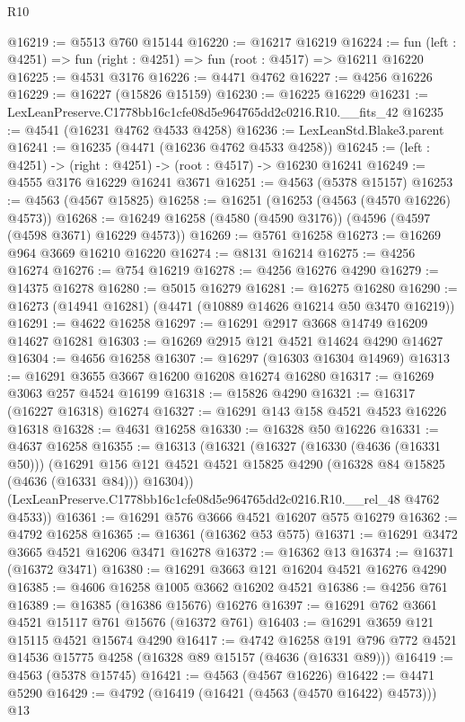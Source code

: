 \begin{lexlean}{R10}
\begin{coremodule}
@16219 := @5513 @760 @15144
@16220 := @16217 @16219
@16224 := fun (left : @4251) => fun (right : @4251) => fun (root : @4517) => @16211 @16220
@16225 := @4531 @3176
@16226 := @4471 @4762
@16227 := @4256 @16226
@16229 := @16227 (@15826 @15159)
@16230 := @16225 @16229
@16231 := LexLeanPreserve.C1778bb16c1cfe08d5e964765dd2c0216.R10.__fits_42
@16235 := @4541 (@16231 @4762 @4533 @4258)
@16236 := LexLeanStd.Blake3.parent
@16241 := @16235 (@4471 (@16236 @4762 @4533 @4258))
@16245 := (left : @4251) -> (right : @4251) -> (root : @4517) -> @16230 @16241
@16249 := @4555 @3176 @16229 @16241 @3671
@16251 := @4563 (@5378 @15157)
@16253 := @4563 (@4567 @15825)
@16258 := @16251 (@16253 (@4563 (@4570 @16226) @4573))
@16268 := @16249 @16258 (@4580 (@4590 @3176)) (@4596 (@4597 (@4598 @3671) @16229 @4573))
@16269 := @5761 @16258
@16273 := @16269 @964 @3669 @16210 @16220
@16274 := @8131 @16214
@16275 := @4256 @16274
@16276 := @754 @16219
@16278 := @4256 @16276 @4290
@16279 := @14375 @16278
@16280 := @5015 @16279
@16281 := @16275 @16280
@16290 := @16273 (@14941 @16281) (@4471 (@10889 @14626 @16214 @50 @3470 @16219))
@16291 := @4622 @16258
@16297 := @16291 @2917 @3668 @14749 @16209 @14627 @16281
@16303 := @16269 @2915 @121 @4521 @14624 @4290 @14627
@16304 := @4656 @16258
@16307 := @16297 (@16303 @16304 @14969)
@16313 := @16291 @3655 @3667 @16200 @16208 @16274 @16280
@16317 := @16269 @3063 @257 @4524 @16199
@16318 := @15826 @4290
@16321 := @16317 (@16227 @16318) @16274
@16327 := @16291 @143 @158 @4521 @4523 @16226 @16318
@16328 := @4631 @16258
@16330 := @16328 @50 @16226
@16331 := @4637 @16258
@16355 := @16313
    (@16321
      (@16327
        (@16330 (@4636 (@16331 @50)))
        (@16291 @156 @121 @4521 @4521 @15825 @4290 (@16328 @84 @15825 (@4636 (@16331 @84))) @16304))
      (LexLeanPreserve.C1778bb16c1cfe08d5e964765dd2c0216.R10.__rel_48 @4762 @4533))
@16361 := @16291 @576 @3666 @4521 @16207 @575 @16279
@16362 := @4792 @16258
@16365 := @16361 (@16362 @53 @575)
@16371 := @16291 @3472 @3665 @4521 @16206 @3471 @16278
@16372 := @16362 @13
@16374 := @16371 (@16372 @3471)
@16380 := @16291 @3663 @121 @16204 @4521 @16276 @4290
@16385 := @4606 @16258 @1005 @3662 @16202 @4521
@16386 := @4256 @761
@16389 := @16385 (@16386 @15676) @16276
@16397 := @16291 @762 @3661 @4521 @15117 @761 @15676 (@16372 @761)
@16403 := @16291 @3659 @121 @15115 @4521 @15674 @4290
@16417 := @4742
    @16258
    @191
    @796
    @772
    @4521
    @14536
    @15775
    @4258
    (@16328 @89 @15157 (@4636 (@16331 @89)))
@16419 := @4563 (@5378 @15745)
@16421 := @4563 (@4567 @16226)
@16422 := @4471 @5290
@16429 := @4792 (@16419 (@16421 (@4563 (@4570 @16422) @4573))) @13

\end{coremodule}
\end{lexlean}
